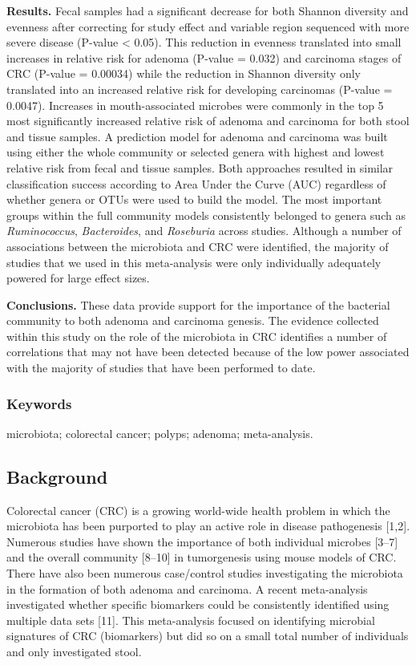 \documentclass[12pt,]{article}
\begin{document}
\textbf{Results.} Fecal samples had a significant decrease for both
Shannon diversity and evenness after correcting for study effect and
variable region sequenced with more severe disease (P-value \textless{}
0.05). This reduction in evenness translated into small increases in
relative risk for adenoma (P-value = 0.032) and carcinoma stages of CRC
(P-value = 0.00034) while the reduction in Shannon diversity only
translated into an increased relative risk for developing carcinomas
(P-value = 0.0047). Increases in mouth-associated microbes were commonly
in the top 5 most significantly increased relative risk of adenoma and
carcinoma for both stool and tissue samples. A prediction model for
adenoma and carcinoma was built using either the whole community or
selected genera with highest and lowest relative risk from fecal and
tissue samples. Both approaches resulted in similar classification
success according to Area Under the Curve (AUC) regardless of whether
genera or OTUs were used to build the model. The most important groups
within the full community models consistently belonged to genera such as
\emph{Ruminococcus}, \emph{Bacteroides}, and \emph{Roseburia} across
studies. Although a number of associations between the microbiota and
CRC were identified, the majority of studies that we used in this
meta-analysis were only individually adequately powered for large effect
sizes.

\textbf{Conclusions.} These data provide support for the importance of
the bacterial community to both adenoma and carcinoma genesis. The
evidence collected within this study on the role of the microbiota in
CRC identifies a number of correlations that may not have been detected
because of the low power associated with the majority of studies that
have been performed to date.

\subsubsection{Keywords}\label{keywords}

microbiota; colorectal cancer; polyps; adenoma; meta-analysis.

\newpage

\subsection{Background}\label{background}

Colorectal cancer (CRC) is a growing world-wide health problem in which
the microbiota has been purported to play an active role in disease
pathogenesis {[}1,2{]}. Numerous studies have shown the importance of
both individual microbes {[}3--7{]} and the overall community
{[}8--10{]} in tumorgenesis using mouse models of CRC. There have also
been numerous case/control studies investigating the microbiota in the
formation of both adenoma and carcinoma. A recent meta-analysis
investigated whether specific biomarkers could be consistently
identified using multiple data sets {[}11{]}. This meta-analysis focused
on identifying microbial signatures of CRC (biomarkers) but did so on a
small total number of individuals and only investigated stool.
\end{document}

